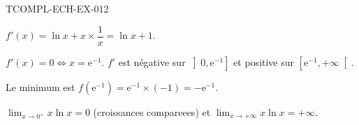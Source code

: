\begin{corrige}{TCOMPL-ECH-EX-012}

$f'(x) = \ln x + x \times \dfrac{1}{x} = \ln x + 1$.


$f'(x) = 0 \iff x = \mathrm{e}^{-1}$. $f'$ est négative sur $\left]0, \mathrm{e}^{-1}\right]$ et positive sur $\left[\mathrm{e}^{-1}, +\infty\right[$.

Le minimum est $f(\mathrm{e}^{-1}) = \mathrm{e}^{-1} \times (-1) = -\mathrm{e}^{-1}$.

$\lim_{x \to 0^+} x\ln x = 0$ (croissances compareees) et $\lim_{x \to +\infty} x\ln x = +\infty$.

\end{corrige}
